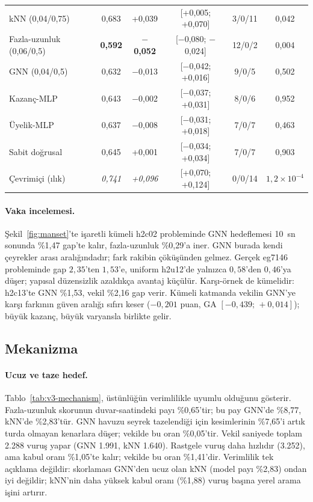 \documentclass[pdflatex,sn-basic]{sn-jnl}
\newcommand{\iyi}[1]{\textcolor{iyiRenk}{\textbf{#1}}}
\newcommand{\kotu}[1]{\textcolor{kotuRenk}{\textit{#1}}}
\begin{document}
\begin{table}[!htbp]
\begin{tabular*}{\textwidth}{@{\extracolsep{\fill}}lccccc@{}}
\quad kNN (0,04/0,75) & 0{,}683 & +0{,}039 & [+0{,}005; +0{,}070] & 3/0/11 & 0{,}042 \\
\quad Fazla-uzunluk (0,06/0,5) & \iyi{0{,}592} & \iyi{$-$0{,}052} & [$-$0{,}080; $-$0{,}024] & 12/0/2 & 0{,}004 \\
\quad GNN (0,04/0,5) & 0{,}632 & $-$0{,}013 & [$-$0{,}042; +0{,}016] & 9/0/5 & 0{,}502 \\
\quad Kazanç-MLP & 0{,}643 & $-$0{,}002 & [$-$0{,}037; +0{,}031] & 8/0/6 & 0{,}952 \\
\quad Üyelik-MLP & 0{,}637 & $-$0{,}008 & [$-$0{,}031; +0{,}018] & 7/0/7 & 0{,}463 \\
\quad Sabit doğrusal & 0{,}645 & +0{,}001 & [$-$0{,}034; +0{,}034] & 7/0/7 & 0{,}903 \\
\quad Çevrimiçi (ılık) & \kotu{0{,}741} & \kotu{+0{,}096} & [+0{,}070; +0{,}124] & 0/0/14 & $1{,}2\times10^{-4}$ \\
\bottomrule
\end{tabular*}
\end{table}

\paragraph{Vaka incelemesi.}
Şekil~\ref{fig:manset}'te işaretli kümeli h2c02 probleminde GNN hedeflemesi 10~sn sonunda \%1,47 gap'te kalır, fazla-uzunluk \%0,29'a iner.
GNN burada kendi çeyrekler arası aralığındadır; fark rakibin çöküşünden
gelmez. Gerçek eg7146
probleminde gap $2{,}35$'ten $1{,}53$'e, uniform h2u12'de yalnızca $0{,}58$'den $0{,}46$'ya
düşer; yapısal düzensizlik azaldıkça avantaj küçülür.
Karşı-örnek de kümelidir: h2c13'te GNN \%1,53, vekil \%2,16 gap verir.
Kümeli katmanda vekilin GNN'ye karşı farkının güven aralığı sıfırı keser ($-0{,}201$ puan, GA
$[-0{,}439;\,+0{,}014]$); büyük kazanç, büyük varyansla birlikte gelir.

\subsection{Mekanizma}\label{sec:bulgular-mekanizma}

\paragraph{Ucuz ve taze hedef.}
Tablo~\ref{tab:v3-mechanism}, üstünlüğün verimlilikle uyumlu olduğunu gösterir.
Fazla-uzunluk skorunun duvar-saatindeki payı \%0,65'tir; bu pay GNN'de \%8,77, kNN'de
\%2,83'tür.
GNN havuzu seyrek tazelendiği için kesimlerinin \%7,65'i artık turda olmayan kenarlara düşer;
vekilde bu oran \%0,05'tir.
Vekil saniyede toplam 2.288 vuruş yapar (GNN 1.991, kNN 1.640).
Rastgele vuruş daha hızlıdır (3.252), ama kabul oranı \%1,05'te kalır; vekilde bu oran
\%1,41'dir.
Verimlilik tek açıklama değildir: skorlaması GNN'den ucuz olan kNN (model payı \%2,83) ondan iyi
değildir; kNN'nin daha yüksek kabul oranı (\%1,88) vuruş başına yerel arama işini artırır.
\end{document}
